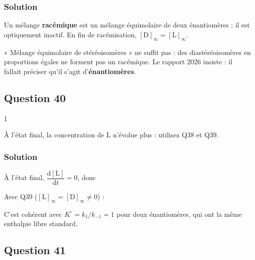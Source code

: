 \documentclass[11pt,a4paper]{article}
\newcommand{\equationajustee}[1]{%
  \sbox{\boiteequation}{$\displaystyle #1$}%
  \ifdim\wd\boiteequation>\linewidth
    \[\resizebox{\linewidth}{!}{\usebox{\boiteequation}}\]%
  \else
    \[#1\]%
  \fi}
\begin{document}
\hypertarget{solution-38}{%
\subsubsection{Solution}\label{solution-38}}

Un mélange \textbf{racémique} est un mélange équimolaire de deux énantiomères ; il est optiquement inactif. En fin de racémisation, \(\boxed{[\mathrm D]_\infty=[\mathrm L]_\infty}\).

\begin{piege}

« Mélange équimolaire de stéréoisomères » ne suffit pas : des diastéréoisomères en proportions égales ne forment pas un racémique. Le rapport 2026 insiste : il fallait préciser qu'il s'agit d'\textbf{énantiomères}.

\end{piege}

\hypertarget{question-40}{%
\subsection{Question 40}\label{question-40}}

\begin{indication}{1}

À l'état final, la concentration de L n'évolue plus : utilisez Q38 et Q39.

\end{indication}

\hypertarget{solution-39}{%
\subsubsection{Solution}\label{solution-39}}

À l'état final, \(\dfrac{\mathrm d[\mathrm L]}{\mathrm dt}=0\), donc

\equationajustee{k_1[\mathrm L]_\infty=k_{-1}[\mathrm D]_\infty.}

Avec Q39 (\([\mathrm L]_\infty=[\mathrm D]_\infty\neq0\)) :

\equationajustee{\boxed{k_1=k_{-1}=k}}

C'est cohérent avec \(K^\circ=k_1/k_{-1}=1\) pour deux énantiomères, qui ont la même enthalpie libre standard.

\hypertarget{question-41}{%
\subsection{Question 41}\label{question-41}}
\end{document}
